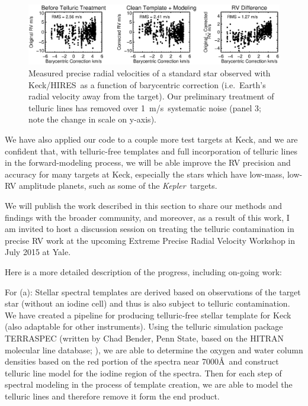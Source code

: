 \documentclass[12pt]{article}
\def\mps{m/s}
\def\kepler{{\it Kepler}}
\def\keck{Keck/HIRES}
\begin{document}
\begin{figure}[thb]
  \vspace{-3pt}
  \begin{center}
    \includegraphics[width=\textwidth]{185144_BC_RV_rj172_4panel}
  \end{center}
  \vspace{-25pt}  
  \caption{Measured precise radial velocities of a standard star
    observed with \keck\ as a function of barycentric correction
    (i.e.~Earth's radial velocity away from the target). Our
    preliminary treatment of telluric lines has removed over
    1~\mps\ systematic noise (panel 3; note the change in scale on
    y-axis).} 
  \vspace{-8pt}  
  \label{fig:tell}
\end{figure}


We have also applied our code to a couple more test targets at Keck,
and we are confident that, with telluric-free templates and full
incorporation of telluric lines in the forward-modeling process, we
will be able improve the RV precision and accuracy for many targets at
Keck, especially the stars which have low-mass, low-RV amplitude
planets, such as some of the \kepler\ targets.

We will publish the work described in this section to share our
methods and findings with the broader community, and moreover, as a
result of this work, I am invited to host a discussion session on
treating the telluric contamination in precise RV work at the upcoming
Extreme Precise Radial Velocity Workshop in July 2015 at Yale.

Here is a more detailed description of the progress, including on-going work:

For (a): Stellar spectral templates are derived based on observations
of the target star (without an iodine cell) and thus is also subject
to telluric contamination. We have created a pipeline for producing
telluric-free stellar template for Keck (also adaptable for other
instruments). Using the telluric simulation package TERRASPEC (written
by Chad Bender, Penn State, based on the HITRAN molecular line
database; \citealt{hitran2012}), we are able to determine the oxygen and water
column densities based on the red portion of the spectra near
7000\AA\ and construct telluric line model for the iodine region of
the spectra. Then for each step of spectral modeling in the process of
template creation, we are able to model the telluric lines and
therefore remove it form the end product.
\end{document}

